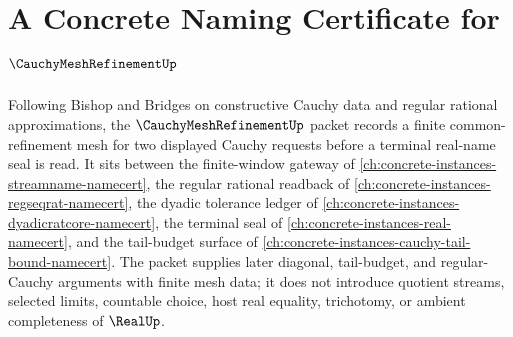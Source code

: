 \chapter{A Concrete Naming Certificate for $\CauchyMeshRefinementUp$}
\label{ch:concrete-instances-cauchy-mesh-refinement-namecert}

Following Bishop and Bridges on constructive Cauchy data and regular rational approximations, the $\CauchyMeshRefinementUp$ packet records a finite common-refinement mesh for two displayed Cauchy requests before a terminal real-name seal is read. It sits between the finite-window gateway of \autoref{ch:concrete-instances-streamname-namecert}, the regular rational readback of \autoref{ch:concrete-instances-regseqrat-namecert}, the dyadic tolerance ledger of \autoref{ch:concrete-instances-dyadicratcore-namecert}, the terminal seal of \autoref{ch:concrete-instances-real-namecert}, and the tail-budget surface of \autoref{ch:concrete-instances-cauchy-tail-bound-namecert}. The packet supplies later diagonal, tail-budget, and regular-Cauchy arguments with finite mesh data; it does not introduce quotient streams, selected limits, countable choice, host real equality, trichotomy, or ambient completeness of $\RealUp$.


